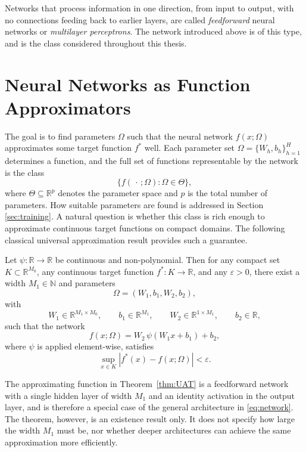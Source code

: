 Networks that process information in one direction, from input to output, with no connections feeding back to earlier layers, are called \emph{feedforward} neural networks or \emph{multilayer perceptrons}. The network introduced above is of this type, and is the class considered throughout this thesis.


\section{Neural Networks as Function Approximators}

The goal is to find parameters $\Omega$ such that the neural network $f(x;\Omega)$ approximates some target function $f^*$ well. Each parameter set $\Omega = \{W_h, b_h\}_{h=1}^H$ determines a function, and the full set of functions representable by the network is the class
\[
    \bigl\{f(\,\cdot\,;\Omega) : \Omega \in \Theta\bigr\},
\]
where $\Theta\subseteq\mathbb{R}^p$ denotes the parameter space and $p$ is the total number of parameters. How suitable parameters are found is addressed in Section \ref{sec:training}. A natural question is whether this class is rich enough to approximate continuous target functions on compact domains. The following classical universal approximation result provides such a guarantee.

\begin{theorem}
\label{thm:UAT}
Let $\psi : \mathbb{R} \to \mathbb{R}$ be continuous and non-polynomial. Then for any compact set $K \subset \mathbb{R}^{M_0}$, any continuous target function $f^* : K \to \mathbb{R}$, and any $\varepsilon > 0$, there exist a width $M_1 \in \mathbb{N}$ and parameters
\[
    \Omega = (W_1,b_1,W_2,b_2),
\]
with
\[
    W_1 \in \mathbb{R}^{M_1 \times M_0},
    \qquad
    b_1 \in \mathbb{R}^{M_1},
    \qquad
    W_2 \in \mathbb{R}^{1 \times M_1},
    \qquad
    b_2 \in \mathbb{R},
\]
such that the network
\[
    f(x;\Omega) = W_2\,\psi(W_1x+b_1) + b_2,
\]
where $\psi$ is applied element-wise, satisfies
\[
    \sup_{x \in K} |f^*(x)-f(x;\Omega)| < \varepsilon.
\]
\end{theorem}

The approximating function in Theorem~\ref{thm:UAT} is a feedforward network with a single hidden layer of width $M_1$ and an identity activation in the output layer, and is therefore a special case of the general architecture in \eqref{eq:network}. The theorem, however, is an existence result only. It does not specify how large the width $M_1$ must be, nor whether deeper architectures can achieve the same approximation more efficiently. 

